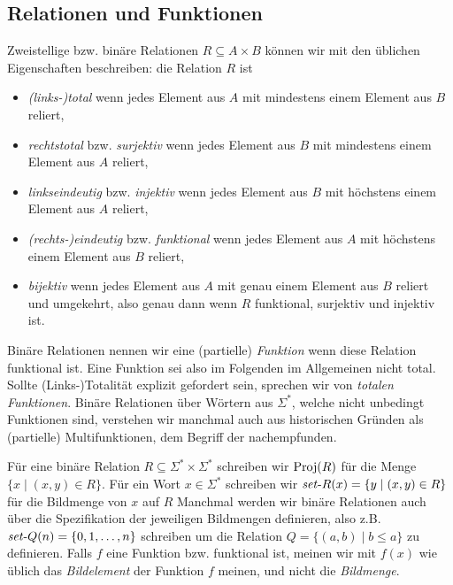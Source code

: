 \subsection*{Relationen und Funktionen}

Zweistellige bzw. binäre Relationen $R\subseteq A\times B$ können wir mit den üblichen Eigenschaften beschreiben: die Relation $R$ ist
\begin{itemize}
    \item \emph{(links-)total} wenn jedes Element aus $A$ mit mindestens einem Element aus $B$ reliert,
    \item \emph{rechtstotal} bzw. \emph{surjektiv} wenn jedes Element aus $B$ mit mindestens einem Element aus $A$ reliert,
    \item \emph{linkseindeutig} bzw. \emph{injektiv} wenn jedes Element aus $B$ mit höchstens einem Element aus $A$ reliert,
    \item \emph{(rechts-)eindeutig} bzw. \emph{funktional} wenn jedes Element aus $A$ mit höchstens einem Element aus $B$ reliert,
    \item \emph{bijektiv} wenn jedes Element aus $A$ mit genau einem Element aus $B$ reliert und umgekehrt, also genau dann wenn $R$ funktional, surjektiv und injektiv ist.
\end{itemize}
Binäre Relationen nennen wir eine (partielle) \emph{Funktion} wenn diese Relation funktional ist. Eine Funktion sei also im Folgenden im Allgemeinen nicht total. Sollte (Links-)Totalität explizit gefordert sein, sprechen wir von \emph{totalen Funktionen}.
Binäre Relationen über Wörtern aus $\Sigma^*$, welche nicht unbedingt Funktionen sind, verstehen wir manchmal auch aus historischen Gründen als (partielle) Multifunktionen, dem Begriff der  nachempfunden.

Für eine binäre Relation $R\subseteq\Sigma^* \times \Sigma^*$ schreiben wir $\operatorname{Proj}(R)$ für die Menge $\{ x\mid (x,y)\in R \}$. 
Für ein Wort $x\in\Sigma^*$ schreiben wir $\mathit{set}\text{-}{}R(x)=\{ y\mid (x,y)\in R \}$ für die Bildmenge von $x$ auf $R$
Manchmal werden wir binäre Relationen auch über die Spezifikation der jeweiligen Bildmengen definieren, also z.B. $\mathit{set}\text{-}{}Q(n) = \{ 0, 1, \dots, n\}$ schreiben um die Relation $Q=\{ (a,b)\mid b\leq a \}$ zu definieren.
Falls $f$ eine Funktion bzw. funktional ist, meinen wir mit $f(x)$ wie üblich das \emph{Bildelement} der Funktion $f$ meinen, und nicht die \emph{Bildmenge}. 



